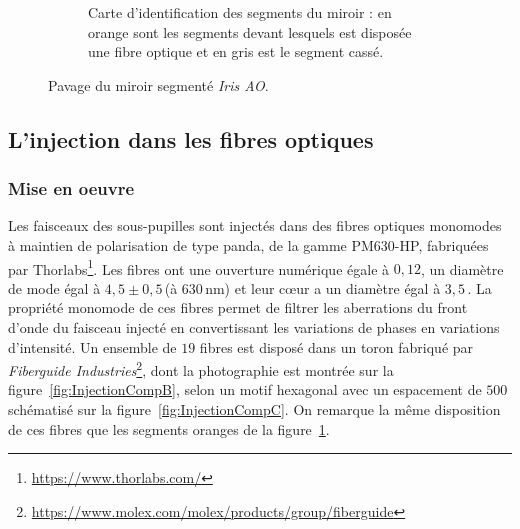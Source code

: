 \begin{figure}[ht!]
\begin{subfigure}[t]{0.5\textwidth}
        \caption{Carte d'identification des segments du miroir : en orange sont les segments devant lesquels est disposée une fibre optique et en gris est le segment cassé.}
        \label{fig:IrisAOMapB}
    \end{subfigure}
    \caption[Pavage du miroir segmenté \textit{Iris AO}.]{Pavage du miroir segmenté \textit{Iris AO}.}
    \label{fig:IrisAOMap}
\end{figure}


\subsection{L'injection dans les fibres optiques}
\label{sec:FiberInjection}

\subsubsection{Mise en oeuvre}

Les faisceaux des sous-pupilles sont injectés dans des fibres optiques monomodes à maintien de polarisation de type panda, de la gamme PM630-HP, fabriquées par Thorlabs\footnote{\url{https://www.thorlabs.com/}}. Les fibres ont une ouverture numérique égale à $0,12$, un diamètre de mode égal à $4,5 \pm 0,5 \,$\um (à $630 \,$nm) et leur cœur a un diamètre égal à $3,5 \,$\um. La propriété monomode de ces fibres permet de filtrer les aberrations du front d'onde du faisceau injecté en convertissant les variations de phases en variations d'intensité. Un ensemble de $19$ fibres est disposé dans un toron fabriqué par \textit{Fiberguide Industries}\footnote{\url{https://www.molex.com/molex/products/group/fiberguide}}, dont la photographie est montrée sur la figure~\ref{fig:InjectionCompB}, selon un motif hexagonal avec un espacement de $500 \,$\um schématisé sur la figure~\ref{fig:InjectionCompC}. On remarque la même disposition de ces fibres que les segments oranges de la figure~\ref{fig:IrisAOMapB}.


